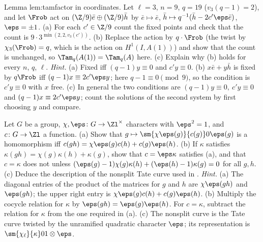 \begin{sloppypar}
\begin{exercise}\label{ex:paper:tamfactor-coordinates}
Lemma lem:tamfactor in coordinates. Let $\ell=3$, $n=9$, $q=19$ ($v_3(q-1)=2$), and let $\Frob$ act on $(\Z/9)\bar e\oplus(\Z/9)\bar h$ by $\bar e\mapsto\bar e$, $\bar h\mapsto q^{-1}(\bar h-2c'\eps\bar e)$, $\eps=\pm1$. (a) For
each $c'\in\Z/9$ count the fixed points and check that the count is $9\cdot3^{\min(2,2,v_3(c'))}$. (b) Replace the action by $q\cdot\Frob$ (the twist by $\chi_3(\Frob)=q$, which is the action on $H^1(I,A(1))$)
and show that the count is unchanged, so $\Tam_q(A(1))=\Tam_q(A)$ here. (c) Explain why (b) holds for every $n$, $q$, $\ell$.
\emph{Hint.} (a) Fixed iff $(q-1)y\equiv0$ and $c'y\equiv0$. (b) $x\bar e+y\bar h$ is fixed by $q\Frob$ iff $(q-1)x\equiv2c'\eps y$; here $q-1\equiv0\pmod9$, so the condition is $c'y\equiv0$ with $x$ free. (c)
In general the two conditions are $(q-1)y\equiv0,\ c'y\equiv0$ and $(q-1)x\equiv2c'\eps y$; count the solutions of the second system by first choosing $y$ and compare.
\end{exercise}

\begin{exercise}\label{ex:paper:corner}
Let $G$ be a group, $\chi,\eps\colon G\to\Zl^\times$ characters with $\eps^2=1$, and $c\colon G\to\Zl$ a function. (a) Show that $g\mapsto\sm{\chi\eps(g)}{c(g)}0{\eps(g)}$ is a homomorphism iff
$c(gh)=\chi\eps(g)c(h)+c(g)\eps(h)$. (b) If $\kappa$ satisfies $\kappa(gh)=\chi(g)\kappa(h)+\kappa(g)$, show that $c=\eps\kappa$ satisfies (a), and that $c=\kappa$ does not unless $(\eps(g)-1)\chi(g)\kappa(h)+(\eps(h)-1)\kappa(g)=0$
for all $g,h$. (c) Deduce the description of the nonsplit Tate curve used in .
\emph{Hint.} (a) The diagonal entries of the product of the matrices for $g$ and $h$ are $\chi\eps(gh)$ and $\eps(gh)$; the upper right entry is $\chi\eps(g)c(h)+c(g)\eps(h)$. (b) Multiply the
cocycle relation for $\kappa$ by $\eps(gh)=\eps(g)\eps(h)$. For $c=\kappa$, subtract the relation for $\kappa$ from the one required in (a). (c) The nonsplit curve is the Tate curve twisted by the
unramified quadratic character $\eps$; its representation is $\sm{\chi_\ell}{\kappa}01\otimes\eps$.
\end{exercise}


\end{sloppypar}
